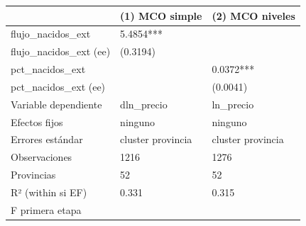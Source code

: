 \begin{tabular}{lll}
\toprule
 & (1) MCO simple & (2) MCO niveles \\
\midrule
flujo\_nacidos\_ext & 5.4854*** &  \\
flujo\_nacidos\_ext (ee) & (0.3194) &  \\
pct\_nacidos\_ext &  & 0.0372*** \\
pct\_nacidos\_ext (ee) &  & (0.0041) \\
Variable dependiente & dln\_precio & ln\_precio \\
Efectos fijos & ninguno & ninguno \\
Errores estándar & cluster provincia & cluster provincia \\
Observaciones & 1216 & 1276 \\
Provincias & 52 & 52 \\
R² (within si EF) & 0.331 & 0.315 \\
F primera etapa &  &  \\
\bottomrule
\end{tabular}
